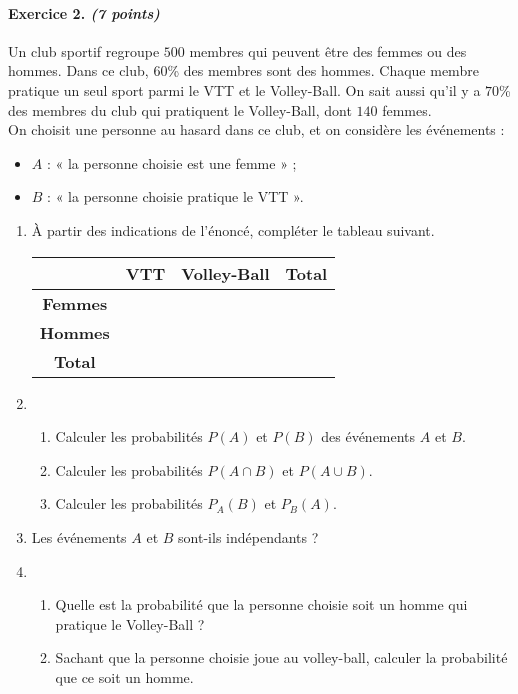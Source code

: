 \documentclass[11pt]{article}
\begin{document}
\newpage
\paragraph{Exercice 2. \emph{(7 points)}} Un club sportif regroupe $500$ membres qui peuvent être
des femmes ou des hommes. Dans ce club, $60$\% des membres sont des hommes.
Chaque membre pratique un seul sport parmi le VTT et le Volley-Ball. On sait
aussi qu'il y a $70$\% des membres du club qui pratiquent le Volley-Ball, dont
$140$ femmes.\\
On choisit une personne au hasard dans ce club, et on considère les événements :
\begin{itemize}
  \item $A$ : « la personne choisie est une femme » ;
  \item $B$ : « la personne choisie pratique le VTT ».
\end{itemize}
\begin{enumerate}
      \item À partir des indications de l'énoncé, compléter le tableau suivant.
    \begin{center}
      \def\arraystretch{1.5}
    \begin{tabular}{|c|c|c|c|}
      \hline
      & \textbf{VTT} & \textbf{Volley-Ball} & \textbf{Total} \\
      \hline
      \textbf{Femmes} & & & \\
      \hline
      \textbf{Hommes} & & & \\
      \hline
      \textbf{Total} & & & \\
      \hline
    \end{tabular}
    \end{center}
  \item \begin{enumerate}
      \item Calculer les probabilités $P(A)$ et $P(B)$ des événements $A$ et
        $B$.
      \item Calculer les probabilités $P(A\cap B)$ et $P(A\cup B)$.
      \item Calculer les probabilités $P_A(B)$ et $P_B(A)$.
    \end{enumerate}
  \item Les événements $A$ et $B$ sont-ils indépendants ?
  \item \begin{enumerate}
      \item Quelle est la probabilité que la personne choisie soit un homme qui
        pratique le Volley-Ball ?
      \item Sachant que la personne choisie joue au volley-ball, calculer la
        probabilité que ce soit un homme.
    \end{enumerate}
\end{enumerate}
\end{document}
